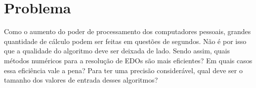 \section{Problema}\label{lproblema}

Como o aumento do poder de processamento dos computadores pessoais, 
grandes quantidade de cálculo podem ser feitas em questões de segundos. 
Não é por isso que a qualidade do algoritmo deve ser deixada de lado. 
Sendo assim, quais métodos numéricos para a resolução de EDOs são mais 
eficientes? Em quais casos essa eficiência vale a pena? Para ter uma 
precisão considerável, qual deve ser o tamanho dos valores de entrada 
desses algoritmos?

